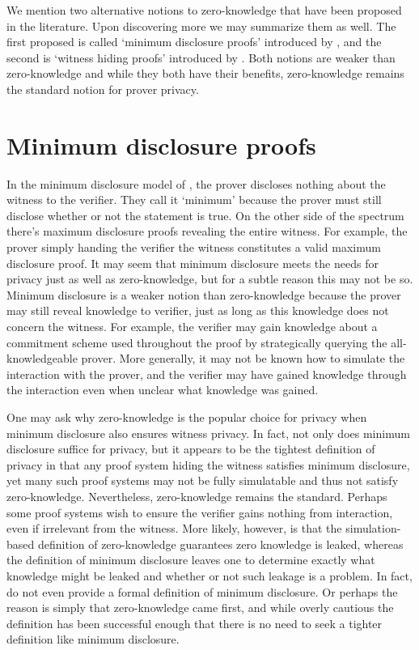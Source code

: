
We mention two alternative notions to zero-knowledge that have been proposed in the literature.
Upon discovering more we may summarize them as well.
The first proposed is called `minimum disclosure proofs' introduced by \cite{BCC87}, and the second is `witness hiding proofs' introduced by \cite{FS90}.
Both notions are weaker than zero-knowledge and while they both have their benefits, zero-knowledge remains the standard notion for prover privacy.


\section{Minimum disclosure proofs}

In the minimum disclosure model of \cite{BCC87}, the prover discloses nothing about the witness to the verifier.
They call it `minimum' because the prover must still disclose whether or not the statement is true. 
On the other side of the spectrum there's maximum disclosure proofs revealing the entire witness.
For example, the prover simply handing the verifier the witness constitutes a valid maximum disclosure proof.
It may seem that minimum disclosure meets the needs for privacy just as well as zero-knowledge, but for a subtle reason this may not be so.
Minimum disclosure is a weaker notion than zero-knowledge because the prover may still reveal knowledge to verifier, just as long as this knowledge does not concern the witness.
For example, the verifier may gain knowledge about a commitment scheme used throughout the proof by strategically querying the all-knowledgeable prover.
More generally, it may not be known how to simulate the interaction with the prover, and the verifier may have gained knowledge through the interaction even when unclear what knowledge was gained.

One may ask why zero-knowledge is the popular choice for privacy when minimum disclosure also ensures witness privacy.
In fact, not only does minimum disclosure suffice for privacy, but it appears to be the tightest definition of privacy in that any proof system hiding the witness satisfies minimum disclosure, yet many such proof systems may not be fully simulatable and thus not satisfy zero-knowledge.
Nevertheless, zero-knowledge remains the standard.
Perhaps some proof systems wish to ensure the verifier gains nothing from interaction, even if irrelevant from the witness.
More likely, however, is that the simulation-based definition of zero-knowledge guarantees zero knowledge is leaked, whereas the definition of minimum disclosure leaves one to determine exactly what knowledge might be leaked and whether or not such leakage is a problem.
In fact, \cite{BCC87} do not even provide a formal definition of minimum disclosure.
Or perhaps the reason is simply that zero-knowledge came first, and while overly cautious the definition has been successful enough that there is no need to seek a tighter definition like minimum disclosure.


